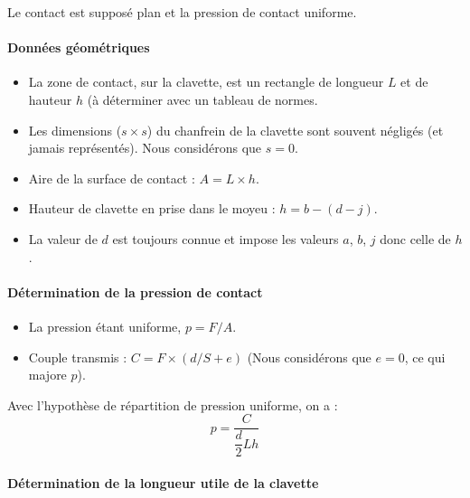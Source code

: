 \documentclass[11pt,oneside]{article}
\begin{document}
Le contact est supposé plan et la pression de contact uniforme.

\paragraph*{Données géométriques}

\begin{itemize}
 \item La zone de contact, sur la clavette, est un rectangle de longueur $L$ et
de hauteur $h$  (à déterminer avec un tableau de normes.
\item Les dimensions ($s\times s$) du chanfrein de la clavette sont souvent négligés
(et jamais représentés). Nous considérons que $s=0$. 
\item Aire de la surface de contact : $A=L \times h$.
\item Hauteur de clavette en prise dans le moyeu : $h=b-(d-j)$.
\item La valeur de $d$ est toujours connue et impose les valeurs $a$, $b$, $j$
donc celle de $h$.
\end{itemize}

\paragraph*{Détermination de la pression de contact}
\begin{itemize}
 \item La pression étant uniforme, $p=F/A$.
\item Couple transmis : $C=F\times (d/S+e)$ (Nous considérons que $e=0$, ce qui
majore $p$).
\end{itemize}


Avec l'hypothèse de répartition de pression uniforme, on a : 
$$
p = \dfrac{C}{\dfrac{d}{2}Lh}
$$

\paragraph*{Détermination de la longueur utile de la clavette}
\end{document}
